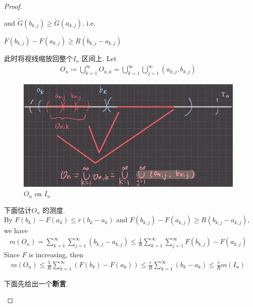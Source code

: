 \begin{thm}
\begin{proof}
\begin{enumerate}
				and $\widetilde{G}(b_{k , j}) \geq \widetilde{G}(a_{k , j})$. i.e.
				\begin{center}
					$F(b_{k , j}) - F(a_{k , j}) \geq R(b_{k , j} - a_{k , j})$
				\end{center}
				此时将视线缩放回整个$I_n$ 区间上. Let
				\begin{align}
					O_n 
					\coloneqq \bigcup_{k = 1}^{\infty}{O_{n , k}} 
					= \bigcup_{k = 1}^{\infty} \bigcup_{j = 1}^{\infty}{(a_{k , j} , b_{k , j})}
				\end{align}
				
				\begin{figure}[thbp!]
					\centering
					\includegraphics[width=0.7\linewidth]{figure/4.6.1-2}
					\caption{$O_{n}$ on $I_n$}
					\label{pic : 4.6.1-2} %
				\end{figure}
				
				\vspace{2em}
				下面估计$O_n$ 的测度. \\
				By $F(b_k) - F(a_k) \leq r(b_k - a_k)$ and $F(b_{k , j}) - F(a_{k , j}) \geq R(b_{k , j} - a_{k , j})$, we have
				\begin{align}
					m(O_n) 
					= \sum_{k = 1}^{\infty} \sum_{j = 1}^{\infty}{(b_{k , j} - a_{k , j})}
					\leq \frac{1}{R} \sum_{k = 1}^{\infty} \sum_{j = 1}^{\infty}{F(b_{k , j}) - F(a_{k , j})}
				\end{align}
				Since $F$ is increasing, then
				\begin{align}
					m(O_n)
					\leq \frac{1}{R} \sum_{k = 1}^{\infty}{\left( F(b_k) - F(a_k) \right)}
					\leq \frac{r}{R} \sum_{k = 1}^{\infty}{(b_k - a_k)}
					\leq \frac{r}{R} m(I_n)
				\end{align}
				
				\newpage
				下面先给出一个\textbf{断言}. 
				
				\vspace{2em}
				

\end{enumerate}
\end{proof}
\end{thm}
